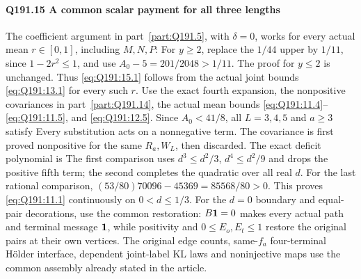 \paragraph{Q191.15 A common scalar payment for all three lengths}\label{part:Q191.15}
The coefficient argument in part~\ref{part:Q191.5}, with $\delta=\allowbreak 0$,
works for every actual mean $r\in[0,\allowbreak 1]$, including $M,\allowbreak N,\allowbreak P$:
For $y\ge\allowbreak 2$, replace the $1/44$ upper by $1/11$, since
$1-2r^2\le\allowbreak 1$, and use $A_0-5=\allowbreak 201/2048>\allowbreak 1/11$. The proof for $y\le\allowbreak 2$
is unchanged. Thus \eqref{eq:Q191:15.1} follows from the actual joint
bounds \eqref{eq:Q191:13.1} for every such $r$.
Use the exact fourth expansion, the nonpositive covariances in
part~\ref{part:Q191.14}, the actual mean bounds
\eqref{eq:Q191:11.4}--\eqref{eq:Q191:11.5}, and
\eqref{eq:Q191:12.5}. Since $A_0<\allowbreak 41/8$, all $L=\allowbreak 3,\allowbreak 4,\allowbreak 5$ and $a\ge\allowbreak 3$
satisfy
Every substitution acts on a nonnegative term. The covariance is first
proved nonpositive for the same $R_a,\allowbreak W_L$, then discarded.
The exact deficit polynomial is
The first comparison uses $d^3\le\allowbreak  d^2/3$, $d^4\le\allowbreak  d^2/9$ and drops
the positive fifth term; the second completes the quadratic over all real
$d$. For the last rational comparison,
$(53/80)70096-45369=\allowbreak 85568/80>\allowbreak 0$.
This proves \eqref{eq:Q191:11.1} continuously on $0<\allowbreak d\le\allowbreak 1/3$.
For the $d=\allowbreak 0$ boundary and equal-pair decorations, use the common
restoration: $B\mathbf1=\allowbreak 0$ makes every actual path and terminal message
$\mathbf1$, while positivity and $0\le\allowbreak  E_o,\allowbreak E_t\le\allowbreak 1$ restore the original
pairs at their own vertices. The original edge counts, same-$f_a$
four-terminal H\"older interface, dependent joint-label KL laws and
noninjective maps use the common assembly already stated in the article.
